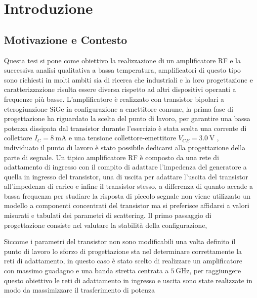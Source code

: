 \documentclass[12pt]{article}
\begin{document}
\section{Introduzione}
\subsection{Motivazione e Contesto}
Questa tesi si pone come obiettivo la realizzazione di un amplificatore RF e la successiva analisi qualitativa a bassa temperatura, amplificatori di questo tipo sono richiesti in molti ambiti sia di ricerca che industriali e la loro progettazione e caratterizzazione risulta essere diversa rispetto ad altri dispositivi operanti a frequenze più basse.
L'amplificatore è realizzato con transistor bipolari a eterogiunzione SiGe in configurazione a emettitore comune, la prima fase di progettazione ha riguardato la scelta del punto di lavoro, per garantire una bassa potenza dissipata dal transistor durante l'esercizio è stata scelta una corrente di collettore $I_{C}=\SI{8}{\milli\ampere}$ e una tensione collettore-emettitore $V_{CE}=\SI{3.0}{\volt}$ , individuato il punto di lavoro è stato possibile dedicarsi alla progettazione della parte di segnale.
Un tipico amplificatore RF è composto da una rete di adattamento di ingresso con il compito di adattare l'impedenza del generatore a quella in ingresso del transistor, una di uscita per adattare l'uscita del transistor all'impedenza di carico e infine il transistor stesso, a differenza di quanto accade a bassa frequenza per studiare la risposta di piccolo segnale non viene utilizzato un modello a componenti concentrati del transistor ma si preferisce affidarsi a valori misurati e tabulati dei parametri di scattering.
Il primo passaggio di progettazione consiste nel valutare la stabilità della configurazione,




Siccome i parametri del transistor non sono modificabili una volta definito il punto di lavoro lo sforzo di progettazione sta nel determinare correttamente la reti di adattamento, in questo caso è stato scelto di realizzare un amplificatore con massimo guadagno e una banda stretta centrata a $\SI{5}{\giga\hertz}$, per raggiungere questo obiettivo le reti di adattamento in ingresso e uscita sono state realizzate in modo da massimizzare il trasferimento di potenza
\end{document}
